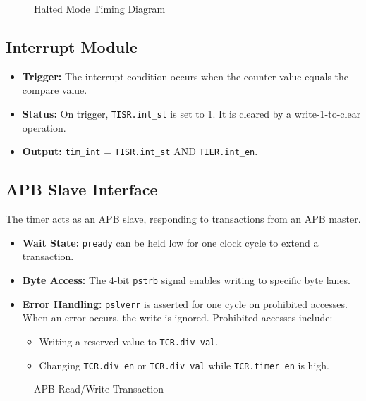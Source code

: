 \documentclass[11pt, a4paper]{article}
\begin{document}
\begin{figure}[H]
    \centering
    \caption{Halted Mode Timing Diagram}
    \label{fig:halt_waveform}
\end{figure}

\subsection{Interrupt Module}
\begin{itemize}
    \item \textbf{Trigger:} The interrupt condition occurs when the counter value equals the compare value.
    \item \textbf{Status:} On trigger, \texttt{TISR.int\_st} is set to 1. It is cleared by a write-1-to-clear operation.
    \item \textbf{Output:} \texttt{tim\_int} = \texttt{TISR.int\_st} AND \texttt{TIER.int\_en}.
\end{itemize}

\subsection{APB Slave Interface}
The timer acts as an APB slave, responding to transactions from an APB master.
\begin{itemize}
    \item \textbf{Wait State:} \texttt{pready} can be held low for one clock cycle to extend a transaction.
    \item \textbf{Byte Access:} The 4-bit \texttt{pstrb} signal enables writing to specific byte lanes.
    \item \textbf{Error Handling:} \texttt{pslverr} is asserted for one cycle on prohibited accesses. When an error occurs, the write is ignored. Prohibited accesses include:
    \begin{itemize}
        \item Writing a reserved value to \texttt{TCR.div\_val}.
        \item Changing \texttt{TCR.div\_en} or \texttt{TCR.div\_val} while \texttt{TCR.timer\_en} is high.
    \end{itemize}
\end{itemize}

\begin{figure}[H]
    \centering
    \caption{APB Read/Write Transaction}
    \label{fig:apb_waveform}
\end{figure}
\end{document}

